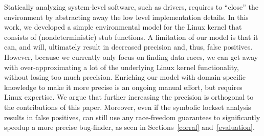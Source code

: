 Statically analyzing system-level software, such as drivers, requires to ``close'' the environment by abstracting away the low level implementation details. In this work, we developed a simple environmental model for the Linux kernel that consists of (nondeterministic) stub functions. A limitation of our model is that it can, and will, ultimately result in decreased precision and, thus, false positives. However, because we currently only focus on finding data races, we can get away with over-approximating a lot of the underlying Linux kernel functionality, without losing too much precision. Enriching our model with domain-specific knowledge to make it more precise is an ongoing manual effort, but requires Linux expertise. We argue that further increasing the precision is orthogonal to the contributions of this paper. Moreover, even if the symbolic lockset analysis results in false positives, \whoop can still use any race-freedom guarantees to significantly speedup a more precise bug-finder, as seen in Sections~\ref{corral} and~\ref{evaluation}.
